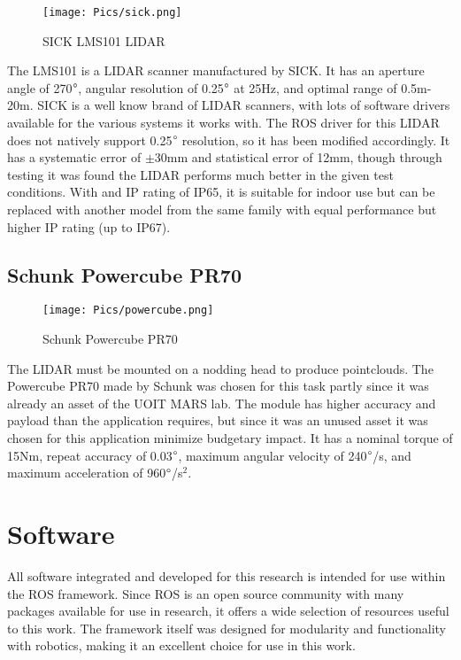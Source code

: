 \begin{figure}[H]
    \centering
    \texttt{[image: Pics/sick.png]}
    \caption{SICK LMS101 LIDAR \cite{sickpage}}
    \label{fig:sick}
\end{figure}
The LMS101 is a LIDAR scanner manufactured by SICK. It has an aperture angle of 270$\degree$, angular resolution of 0.25$\degree$ at 25Hz, and optimal range of 0.5m-20m. SICK is a well know brand of LIDAR scanners, with lots of software drivers available for the various systems it works with. The ROS driver for this LIDAR does not natively support 0.25$\degree$ resolution, so it has been modified accordingly. It has a systematic error of $\pm$30mm and statistical error	of 12mm, though through testing it was found the LIDAR performs much better in the given test conditions. With and IP rating of IP65, it is suitable for indoor use but can be replaced with another model from the same family with equal performance but higher IP rating (up to IP67).\\
\subsection{Schunk Powercube PR70}
\begin{figure}[H]
    \centering
    \texttt{[image: Pics/powercube.png]}
    \caption{Schunk Powercube PR70 \cite{schunkpage}}
    \label{fig:schunk}
\end{figure}
The LIDAR must be mounted on a nodding head to produce pointclouds. The Powercube PR70 made by Schunk was chosen for this task partly since it was already an asset of the UOIT MARS lab. The module has higher accuracy and payload than the application requires, but since it was an unused asset it was chosen for this application minimize budgetary impact. It has a nominal torque of 15Nm, repeat accuracy of 0.03$\degree$, maximum angular velocity of 240$\degree$/s, and maximum acceleration of 960$\degree$/s$^2$. \\
\section{Software}
\label{sec:software}
All software integrated and developed for this research is intended for use within the ROS framework. Since ROS is an open source community with many packages available for use in research, it offers a wide selection of resources useful to this work. The framework itself was designed for modularity and functionality with robotics, making it an excellent choice for use in this work.\\
